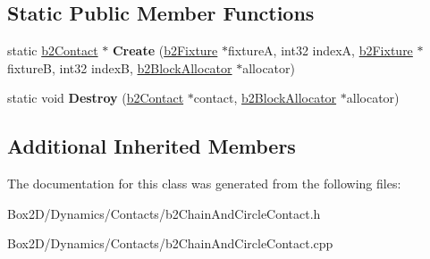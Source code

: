 \subsection*{Static Public Member Functions}
\begin{DoxyCompactItemize}
\item 
\mbox{\label{classb2_chain_and_circle_contact_a9738f9b3eeddb824213abaae78ff6a73}} 
static \hyperlink{classb2_contact}{b2\+Contact} $\ast$ {\bfseries Create} (\hyperlink{classb2_fixture}{b2\+Fixture} $\ast$fixtureA, int32 indexA, \hyperlink{classb2_fixture}{b2\+Fixture} $\ast$fixtureB, int32 indexB, \hyperlink{classb2_block_allocator}{b2\+Block\+Allocator} $\ast$allocator)
\item 
\mbox{\label{classb2_chain_and_circle_contact_a1070fc727a3c52a160c7919c9650b4e3}} 
static void {\bfseries Destroy} (\hyperlink{classb2_contact}{b2\+Contact} $\ast$contact, \hyperlink{classb2_block_allocator}{b2\+Block\+Allocator} $\ast$allocator)
\end{DoxyCompactItemize}
\subsection*{Additional Inherited Members}


The documentation for this class was generated from the following files\+:\begin{DoxyCompactItemize}
\item 
Box2\+D/\+Dynamics/\+Contacts/b2\+Chain\+And\+Circle\+Contact.\+h\item 
Box2\+D/\+Dynamics/\+Contacts/b2\+Chain\+And\+Circle\+Contact.\+cpp\end{DoxyCompactItemize}
